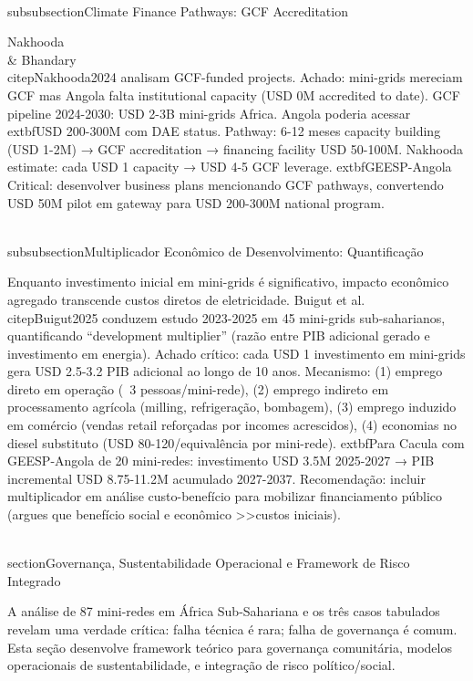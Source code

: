 \documentclass[12pt, a4paper]{article}
\begin{document}
{{{{{{{{{{{\\subsubsection{Climate Finance Pathways: GCF Accreditation}

Nakhooda \\& Bhandary~\\citep{Nakhooda2024} analisam GCF-funded projects. Achado: mini-grids mereciam GCF mas Angola falta institutional capacity (USD 0M accredited to date). GCF pipeline 2024-2030: USD 2-3B mini-grids Africa. Angola poderia acessar 	extbf{USD 200-300M} com DAE status. Pathway: 6-12 meses capacity building (USD 1-2M) → GCF accreditation → financing facility USD 50-100M. Nakhooda estimate: cada USD 1 capacity → USD 4-5 GCF leverage. 	extbf{GEESP-Angola Critical}: desenvolver business plans mencionando GCF pathways, convertendo USD 50M pilot em gateway para USD 200-300M national program.

\\subsubsection{Multiplicador Econômico de Desenvolvimento: Quantificação}

Enquanto investimento inicial em mini-grids é significativo, impacto econômico agregado transcende custos diretos de eletricidade. Buigut et al.~\\citep{Buigut2025} conduzem estudo 2023-2025 em 45 mini-grids sub-saharianos, quantificando ``development multiplier'' (razão entre PIB adicional gerado e investimento em energia). Achado crítico: cada USD 1 investimento em mini-grids gera USD 2.5-3.2 PIB adicional ao longo de 10 anos. Mecanismo: (1) emprego direto em operação (~3 pessoas/mini-rede), (2) emprego indireto em processamento agrícola (milling, refrigeração, bombagem), (3) emprego induzido em comércio (vendas retail reforçadas por incomes acrescidos), (4) economias no diesel substituto (USD 80-120/equivalência por mini-rede). 	extbf{Para Cacula com GEESP-Angola de 20 mini-redes}: investimento USD 3.5M 2025-2027 → PIB incremental USD 8.75-11.2M acumulado 2027-2037. Recomendação: incluir multiplicador em análise custo-benefício para mobilizar financiamento público (argues que benefício social e econômico >>custos iniciais).



\\section{Governança, Sustentabilidade Operacional e Framework de Risco Integrado}

A análise de 87 mini-redes em África Sub-Sahariana e os três casos tabulados revelam uma verdade crítica: falha técnica é rara; falha de governança é comum. Esta seção desenvolve framework teórico para governança comunitária, modelos operacionais de sustentabilidade, e integração de risco político/social.

}}}}}}}}}}}
\end{document}
